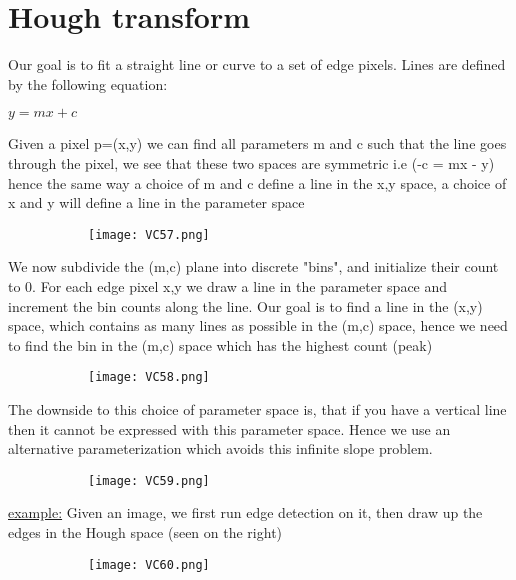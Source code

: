 \documentclass[8pt]{extreport}
\begin{document}
\section{Hough transform}

Our goal is to fit a straight line or curve to a set of edge pixels. Lines are defined by the following equation:
\begin{center}
$y = mx + c$
\end{center}
Given a pixel p=(x,y) we can find all parameters m and c such that the line goes through the pixel, we see that these two spaces are symmetric i.e (-c = mx - y) hence the same way a choice of m and c define a line in the x,y space, a choice of x and y will define a line in the parameter space
 \begin{figure}[H]
\centering
\begin{subfigure}[b]{0.32\linewidth}
\texttt{[image: VC57.png]}
\end{subfigure}
\end{figure} 
We now subdivide the (m,c) plane into discrete "bins", and initialize their count to 0. For each edge pixel x,y we draw a line in the parameter space and increment the bin counts along the line. Our goal is to find a line in the (x,y) space, which contains as many lines as possible in the (m,c) space, hence we need to find the bin in the (m,c) space which has the highest count (peak)
 \begin{figure}[H]
\centering
\begin{subfigure}[b]{0.32\linewidth}
\texttt{[image: VC58.png]}
\end{subfigure}
\end{figure} 
The downside to this choice of parameter space is, that if you have a vertical line then it cannot be expressed with this parameter space. Hence we use an alternative parameterization which avoids this infinite slope problem.  
 \begin{figure}[H]
\centering
\begin{subfigure}[b]{0.32\linewidth}
\texttt{[image: VC59.png]}
\end{subfigure}
\end{figure} 
\underline{example:}
Given an image, we first run edge detection on it, then draw up the edges in the Hough space (seen on the right)
 \begin{figure}[H]
\centering
\begin{subfigure}[b]{0.32\linewidth}
\texttt{[image: VC60.png]}
\end{subfigure}
\end{figure} 
\end{document}
